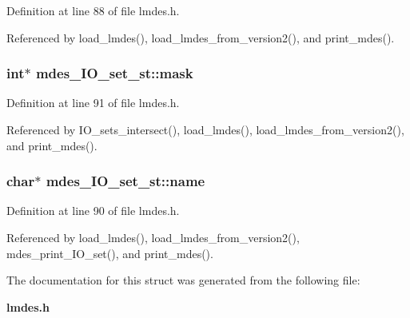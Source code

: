 Definition at line 88 of file lmdes.h.

Referenced by load\_\-lmdes(), load\_\-lmdes\_\-from\_\-version2(), and print\_\-mdes().
\subsubsection{\setlength{\rightskip}{0pt plus 5cm}int$\ast$ \bf{mdes\_\-IO\_\-set\_\-st::mask}}\label{structmdes__IO__set__st_9686f5e9e1c1c20ea435e4e1a654ad70}




Definition at line 91 of file lmdes.h.

Referenced by IO\_\-sets\_\-intersect(), load\_\-lmdes(), load\_\-lmdes\_\-from\_\-version2(), and print\_\-mdes().
\subsubsection{\setlength{\rightskip}{0pt plus 5cm}char$\ast$ \bf{mdes\_\-IO\_\-set\_\-st::name}}\label{structmdes__IO__set__st_204a1bad5b020f415a38cb383531dc08}




Definition at line 90 of file lmdes.h.

Referenced by load\_\-lmdes(), load\_\-lmdes\_\-from\_\-version2(), mdes\_\-print\_\-IO\_\-set(), and print\_\-mdes().

The documentation for this struct was generated from the following file:\begin{CompactItemize}
\item 
\bf{lmdes.h}\end{CompactItemize}
